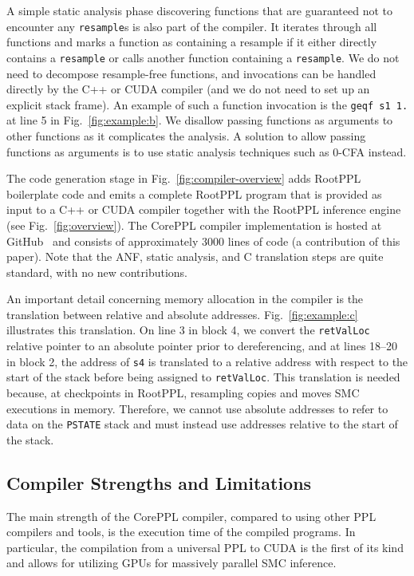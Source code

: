 \documentclass[runningheads]{llncs}
\newcommand{\rlstinline}{\lstinline[language=RootPPL]}
\begin{document}
A simple static analysis phase discovering functions that are guaranteed not to encounter any \lstinline!resample!s is also part of the compiler.
It iterates through all functions and marks a function as containing a resample if it either directly contains a \lstinline!resample! or calls another function containing a \lstinline!resample!.
We do not need to decompose resample-free functions, and invocations can be handled directly by the C++ or CUDA compiler (and we do not need to set up an explicit stack frame).
An example of such a function invocation is the \lstinline!geqf s1 1.! at line 5 in Fig.~\ref{fig:example:b}.
We disallow passing functions as arguments to other functions as it complicates the analysis.
A solution to allow passing functions as arguments is to use static analysis techniques such as 0-CFA \cite{nielson1999principles} instead.

The code generation stage in Fig.~\ref{fig:compiler-overview} adds RootPPL boilerplate code and emits a complete RootPPL program that is provided as input to a C++ or CUDA compiler together with the RootPPL inference engine (see Fig.~\ref{fig:overview}).
The CorePPL compiler implementation is hosted at GitHub~\cite{mikingdppl2021} and consists of approximately 3000 lines of code (a contribution of this paper).
Note that the ANF, static analysis, and C translation steps are quite standard, with no new contributions.

An important detail concerning memory allocation in the compiler is the translation between relative and absolute addresses.
Fig.~\ref{fig:example:c} illustrates this translation.
On line 3 in block 4, we convert the \lstinline!retValLoc! relative pointer to an absolute pointer prior to dereferencing, and at lines 18--20 in block 2, the address of \lstinline!s4! is translated to a relative address with respect to the start of the stack before being assigned to \lstinline!retValLoc!.
This translation is needed because, at checkpoints in RootPPL, resampling copies and moves SMC executions in memory.
Therefore, we cannot use absolute addresses to refer to data on the \rlstinline!PSTATE! stack and must instead use addresses relative to the start of the stack.

\subsection{Compiler Strengths and Limitations}\label{sec:lim}
The main strength of the CorePPL compiler, compared to using other PPL compilers and tools, is the execution time of the compiled programs.
In particular, the compilation from a universal PPL to CUDA is the first of its kind and allows for utilizing GPUs for massively parallel SMC inference.
\end{document}
